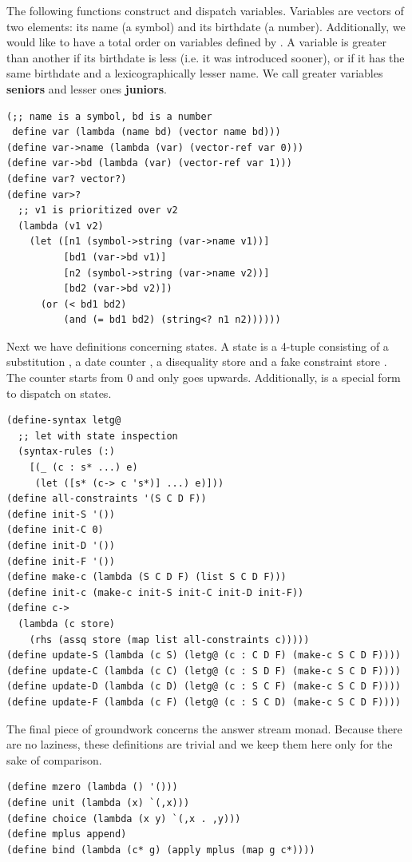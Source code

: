 The following functions construct and dispatch variables. Variables are vectors of two elements: its name (a symbol) and its birthdate (a number). Additionally, we would like to have a total order on variables defined by . A variable is greater than another if its birthdate is less (i.e. it was introduced sooner), or if it has the same birthdate and a lexicographically lesser name. We call greater variables \textbf{seniors} and lesser ones \textbf{juniors}.
\begin{lstlisting}
(;; name is a symbol, bd is a number
 define var (lambda (name bd) (vector name bd)))
(define var->name (lambda (var) (vector-ref var 0)))
(define var->bd (lambda (var) (vector-ref var 1)))
(define var? vector?)
(define var>?
  ;; v1 is prioritized over v2
  (lambda (v1 v2)
    (let ([n1 (symbol->string (var->name v1))]
          [bd1 (var->bd v1)]
          [n2 (symbol->string (var->name v2))]
          [bd2 (var->bd v2)])
      (or (< bd1 bd2)
          (and (= bd1 bd2) (string<? n1 n2))))))
\end{lstlisting}

Next we have definitions concerning states. A state is a 4-tuple consisting of a substitution , a date counter , a disequality store  and a fake constraint store . The counter starts from 0 and only goes upwards. Additionally,  is a special form to dispatch on states.
\begin{lstlisting}
(define-syntax letg@
  ;; let with state inspection
  (syntax-rules (:)
    [(_ (c : s* ...) e)
     (let ([s* (c-> c 's*)] ...) e)]))
(define all-constraints '(S C D F))
(define init-S '())
(define init-C 0)
(define init-D '())
(define init-F '())
(define make-c (lambda (S C D F) (list S C D F)))
(define init-c (make-c init-S init-C init-D init-F))
(define c->
  (lambda (c store)
    (rhs (assq store (map list all-constraints c)))))
(define update-S (lambda (c S) (letg@ (c : C D F) (make-c S C D F))))
(define update-C (lambda (c C) (letg@ (c : S D F) (make-c S C D F))))
(define update-D (lambda (c D) (letg@ (c : S C F) (make-c S C D F))))
(define update-F (lambda (c F) (letg@ (c : S C D) (make-c S C D F))))
\end{lstlisting}

The final piece of groundwork concerns the answer stream monad. Because there are no laziness, these definitions are trivial and we keep them here only for the sake of comparison.
\begin{lstlisting}
(define mzero (lambda () '()))
(define unit (lambda (x) `(,x)))
(define choice (lambda (x y) `(,x . ,y)))
(define mplus append)
(define bind (lambda (c* g) (apply mplus (map g c*))))
\end{lstlisting}

